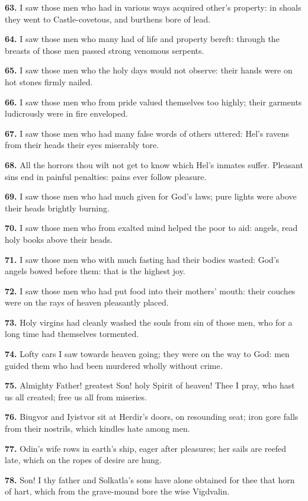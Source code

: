 \textbf{63.} I saw those men who had in various ways acquired other's
property: in shoals they went to Castle-covetous, and burthens bore of
lead.

\textbf{64.} I saw those men who many had of life and property bereft:
through the breasts of those men passed strong venomous serpents.

\textbf{65.} I saw those men who the holy days would not observe: their hands
were on hot stones firmly nailed.

\textbf{66.} I saw those men who from pride valued themselves too highly;
their garments ludicrously were in fire enveloped.

\textbf{67.} I saw those men who had many false words of others uttered:
Hel's ravens from their heads their eyes miserably tore.

\textbf{68.} All the horrors thou wilt not get to know which Hel's inmates
suffer. Pleasant sins end in painful penalties: pains ever follow
pleasure.

\textbf{69.} I saw those men who had much given for God's laws; pure lights
were above their heads brightly burning.

\textbf{70.} I saw those men who from exalted mind helped the poor to aid:
angels, read holy books above their heads.

\textbf{71.} I saw those men who with much fasting had their bodies wasted:
God's angels bowed before them: that is the highest joy.

\textbf{72.} I saw those men who had put food into their mothers' mouth:
their couches were on the rays of heaven pleasantly placed.

\textbf{73.} Holy virgins had cleanly washed the souls from sin of those men,
who for a long time had themselves tormented.

\textbf{74.} Lofty cars I saw towards heaven going; they were on the way to
God: men guided them who had been murdered wholly without crime.

\textbf{75.} Almighty Father! greatest Son! holy Spirit of heaven! Thee I
pray, who hast us all created; free us all from miseries.

\textbf{76.} Biugvor and Iyistvor sit at Herdir's doors, on resounding seat;
iron gore falls from their nostrils, which kindles hate among men.

\textbf{77.} Odin's wife rows in earth's ship, eager after pleasures; her
sails are reefed late, which on the ropes of desire are hung.

\textbf{78.} Son! I thy father and Solkatla's sons have alone obtained for
thee that horn of hart, which from the grave-mound bore the wise
Vigdvalin.

